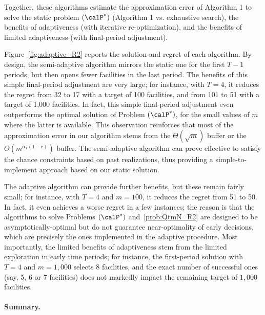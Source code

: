 \documentclass[11pt]{article}
\begin{document}
Together, these algorithms estimate the approximation error of Algorithm 1 to solve the static problem $(\calP^*)$ (Algorithm 1 vs. exhaustive search), the benefits of adaptiveness (with iterative re-optimization), and the benefits of limited adaptiveness (with final-period adjustment).

Figure~\ref{fig:adaptive_R2} reports the solution and regret of each algorithm. By design, the semi-adaptive algorithm mirrors the static one for the first $T-1$ periods, but then opens fewer facilities in the last period. The benefits of this simple final-period adjustment are very large; for instance, with $T=4$, it reduces the regret from 32 to 17 with a target of 100 facilities, and from 101 to 51 with a target of 1,000 facilities. In fact, this simple final-period adjustment even outperforms the optimal solution of Problem $(\calP^*)$, for the small values of $m$ where the latter is available. This observation reinforces that most of the approximation error in our algorithm stems from the $\Theta(\sqrt{m})$ buffer or the $\Theta(m^{\alpha_T(1-r)})$ buffer. The semi-adaptive algorithm can prove effective to satisfy the chance constraints based on past realizations, thus providing a simple-to-implement approach based on our static solution.

The adaptive algorithm can provide further benefits, but these remain fairly small; for instance, with $T=4$ and $m=100$, it reduces the regret from 51 to 50. In fact, it even achieves a worse regret in a few instances; the reason is that the algorithms to solve Problems $(\calP^*)$ and~\eqref{prob:QtmN_R2} are designed to be asymptotically-optimal but do not guarantee near-optimality of early decisions, which are precisely the ones implemented in the adaptive procedure. Most importantly, the limited benefits of adaptiveness stem from the limited exploration in early time periods; for instance, the first-period solution with $T=4$ and $m=1,000$ selects 8 facilities, and the exact number of successful ones (say, 5, 6 or 7 facilities) does not markedly impact the remaining target of $1,000$ facilities.

\paragraph{Summary.}
\end{document}

